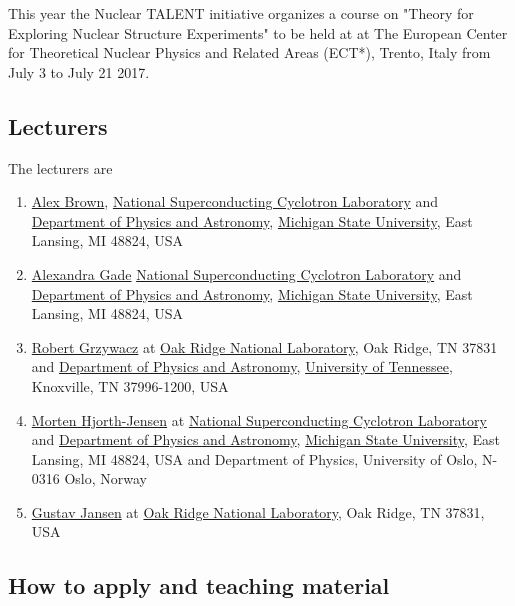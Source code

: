 \documentclass[%
oneside,                 %
final,                   %
10pt]{article}
\begin{document}
This year the Nuclear TALENT initiative organizes a course on 
"Theory for Exploring Nuclear Structure Experiments" to be held at
at The European Center for Theoretical Nuclear Physics and Related Areas
(ECT*), Trento, Italy from July 3 to July 21 2017. 

\subsection*{Lecturers}
The lecturers are 
\begin{enumerate}
\item \href{{https://people.nscl.msu.edu/~brown/}}{Alex Brown}, \href{{http://www.nscl.msu.edu/}}{National Superconducting Cyclotron Laboratory} and \href{{https://www.pa.msu.edu/}}{Department of Physics and Astronomy}, \href{{http://www.msu.edu/}}{Michigan State University}, East Lansing, MI 48824, USA

\item \href{{https://people.nscl.msu.edu/~gade/}}{Alexandra Gade}  \href{{http://www.nscl.msu.edu/}}{National Superconducting Cyclotron Laboratory} and \href{{https://www.pa.msu.edu/}}{Department of Physics and Astronomy}, \href{{http://www.msu.edu/}}{Michigan State University}, East Lansing, MI 48824, USA

\item \href{{http://web.utk.edu/~rgrzywac/}}{Robert Grzywacz}  at \href{{http://www.ornl.gov/}}{Oak Ridge National Laboratory}, Oak Ridge, TN 37831  and \href{{https://www.phys.utk.edu/}}{Department of Physics and Astronomy}, \href{{http://www.utk.edu/}}{University of Tennessee}, Knoxville, TN 37996-1200, USA

\item \href{{http://mhjgit.github.io/info/doc/web/}}{Morten Hjorth-Jensen}  at \href{{http://www.nscl.msu.edu/}}{National Superconducting Cyclotron Laboratory} and \href{{https://www.pa.msu.edu/}}{Department of Physics and Astronomy}, \href{{http://www.msu.edu/}}{Michigan State University}, East Lansing, MI 48824, USA and  Department of Physics, University of Oslo, N-0316 Oslo, Norway

\item \href{{https://www.ornl.gov/staff-profile/gustav-r-jansen}}{Gustav Jansen}  at \href{{http://www.ornl.gov/}}{Oak Ridge National Laboratory}, Oak Ridge, TN 37831, USA
\end{enumerate}

\noindent
\subsection*{How to apply and teaching material}
\end{document}
